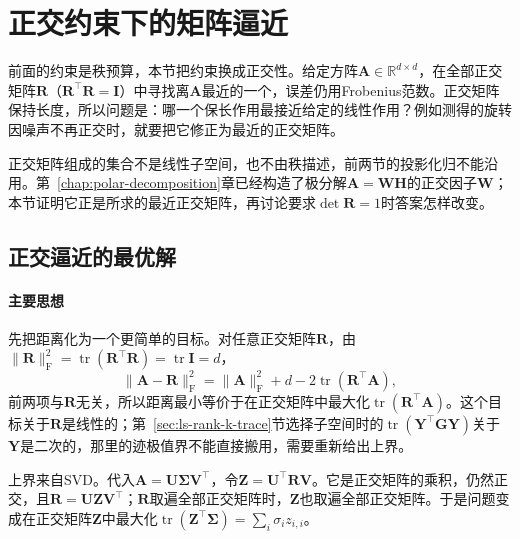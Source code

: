
\section{正交约束下的矩阵逼近}
\label{sec:matrix-approximation-orthogonal}

前面的约束是秩预算，本节把约束换成正交性。给定方阵$\bm A\in\mathbb R^{d\times d}$，在全部正交矩阵$\bm R$（$\bm R^\top\bm R=\bm I$）中寻找离$\bm A$最近的一个，误差仍用Frobenius范数。正交矩阵保持长度，所以问题是：哪一个保长作用最接近给定的线性作用？例如测得的旋转因噪声不再正交时，就要把它修正为最近的正交矩阵。

正交矩阵组成的集合不是线性子空间，也不由秩描述，前两节的投影化归不能沿用。第~\ref{chap:polar-decomposition}章已经构造了极分解$\bm A=\bm W\bm H$的正交因子$\bm W$；本节证明它正是所求的最近正交矩阵，再讨论要求$\det\bm R=1$时答案怎样改变。

\subsection{正交逼近的最优解}
\label{sec:matrix-approximation-orthogonal-optimum}

\paragraph{主要思想}

先把距离化为一个更简单的目标。对任意正交矩阵$\bm R$，由$\lVert\bm R\rVert_{\mathrm F}^2=\operatorname{tr}(\bm R^\top\bm R)=\operatorname{tr}\bm I=d$，
\[
 \lVert\bm A-\bm R\rVert_{\mathrm F}^2
 =\lVert\bm A\rVert_{\mathrm F}^2+d-2\operatorname{tr}(\bm R^\top\bm A),
\]
前两项与$\bm R$无关，所以距离最小等价于在正交矩阵中最大化$\operatorname{tr}(\bm R^\top\bm A)$。这个目标关于$\bm R$是线性的；第~\ref{sec:ls-rank-k-trace}节选择子空间时的$\operatorname{tr}(\bm Y^\top\bm G\bm Y)$关于$\bm Y$是二次的，那里的迹极值界不能直接搬用，需要重新给出上界。

上界来自SVD。代入$\bm A=\bm U\bm\Sigma\bm V^\top$，令$\bm Z=\bm U^\top\bm R\bm V$。它是正交矩阵的乘积，仍然正交，且$\bm R=\bm U\bm Z\bm V^\top$；$\bm R$取遍全部正交矩阵时，$\bm Z$也取遍全部正交矩阵。于是问题变成在正交矩阵$\bm Z$中最大化$\operatorname{tr}(\bm Z^\top\bm\Sigma)=\sum_i\sigma_iz_{i,i}$。

